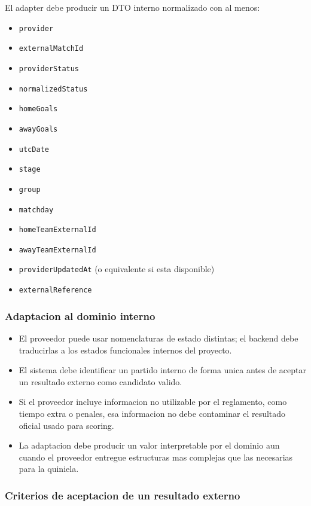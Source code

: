 El adapter debe producir un DTO interno normalizado con al menos:
\begin{itemize}
  \item \texttt{provider}
  \item \texttt{externalMatchId}
  \item \texttt{providerStatus}
  \item \texttt{normalizedStatus}
  \item \texttt{homeGoals}
  \item \texttt{awayGoals}
  \item \texttt{utcDate}
  \item \texttt{stage}
  \item \texttt{group}
  \item \texttt{matchday}
  \item \texttt{homeTeamExternalId}
  \item \texttt{awayTeamExternalId}
  \item \texttt{providerUpdatedAt} (o equivalente si esta disponible)
  \item \texttt{externalReference}
\end{itemize}

\subsubsection{Adaptacion al dominio interno}

\begin{itemize}
  \item El proveedor puede usar nomenclaturas de estado distintas; el backend debe traducirlas a los estados funcionales internos del proyecto.
  \item El sistema debe identificar un partido interno de forma unica antes de aceptar un resultado externo como candidato valido.
  \item Si el proveedor incluye informacion no utilizable por el reglamento, como tiempo extra o penales, esa informacion no debe contaminar el resultado oficial usado para scoring.
  \item La adaptacion debe producir un valor interpretable por el dominio aun cuando el proveedor entregue estructuras mas complejas que las necesarias para la quiniela.
\end{itemize}

\subsubsection{Criterios de aceptacion de un resultado externo}

